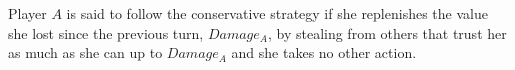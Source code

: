 {}
\begin{definition}
   Player $A$ is said to follow the conservative strategy if she replenishes the value she lost since the previous turn,
   $Damage_A$, by stealing from others that trust her as much as she can up to $Damage_A$ and she takes no other action.
\end{definition}

